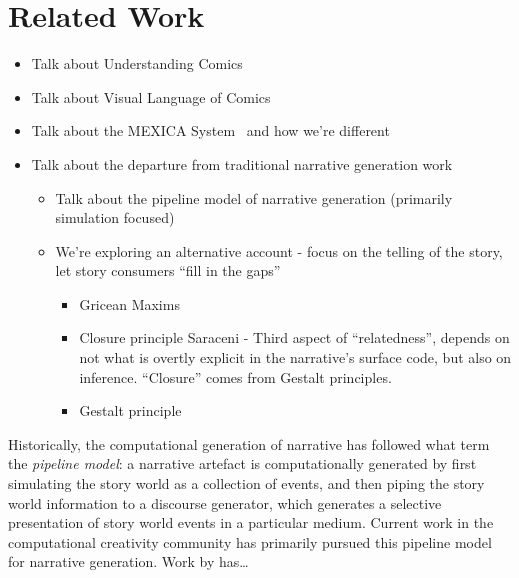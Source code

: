 \section{Related Work}





\begin{itemize}

	\item Talk about Understanding Comics~\cite{mcCloud1993understanding}
	\item Talk about Visual Language of Comics~\cite{cohn2013visual}
	\item Talk about the MEXICA System~\cite{perez2001mexica} and how we're different
	\item Talk about the departure from traditional narrative generation work
	\begin{itemize}
		\item Talk about the pipeline model of narrative generation (primarily 
		simulation focused)
		\item We're exploring an alternative account - 
		focus on the telling of the story, let story consumers ``fill in the gaps''
		
		\begin{itemize}
			\item Gricean Maxims
			\item Closure principle Saraceni - Third aspect of ``relatedness'', 
			depends on not what is overtly explicit in the narrative's surface 
			code, but also on inference.  ``Closure'' comes from Gestalt principles.
			\item Gestalt principle 
	\end{itemize}
	\end{itemize}

\end{itemize}



Historically, the computational generation of narrative has followed what  term the \emph{pipeline model}: a narrative artefact is computationally generated by first simulating the story world as a collection of events, and then piping the story world information to a discourse generator, which generates a selective presentation of story world events in a particular medium. Current work in the computational creativity community has primarily pursued this pipeline model for narrative generation. Work by  has\ldots



